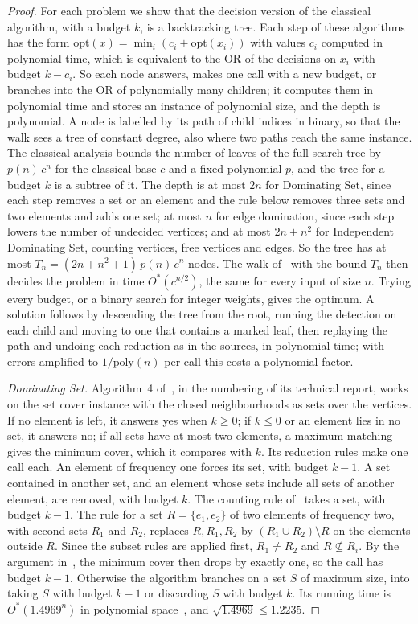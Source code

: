 \documentclass[11pt]{article}
\theoremstyle{remark}
\begin{document}
\begin{proof}
For each problem we show that the decision version of the classical algorithm, with a budget $k$, is a backtracking tree. Each step of these algorithms has the form $\mathrm{opt}(x) = \min_i (c_i + \mathrm{opt}(x_i))$ with values $c_i$ computed in polynomial time, which is equivalent to the OR of the decisions on $x_i$ with budget $k - c_i$. So each node answers, makes one call with a new budget, or branches into the OR of polynomially many children; it computes them in polynomial time and stores an instance of polynomial size, and the depth is polynomial. A node is labelled by its path of child indices in binary, so that the walk sees a tree of constant degree, also where two paths reach the same instance. The classical analysis bounds the number of leaves of the full search tree by $p(n)\,c^n$ for the classical base $c$ and a fixed polynomial $p$, and the tree for a budget $k$ is a subtree of it. The depth is at most $2n$ for Dominating Set, since each step removes a set or an element and the rule below removes three sets and two elements and adds one set; at most $n$ for edge domination, since each step lowers the number of undecided vertices; and at most $2n + n^2$ for Independent Dominating Set, counting vertices, free vertices and edges. So the tree has at most $T_n = (2n + n^2 + 1)\,p(n)\,c^n$ nodes. The walk of~\cite{Mon18} with the bound $T_n$ then decides the problem in time $O^*(c^{n/2})$, the same for every input of size $n$. Trying every budget, or a binary search for integer weights, gives the optimum. A solution follows by descending the tree from the root, running the detection on each child and moving to one that contains a marked leaf, then replaying the path and undoing each reduction as in the sources, in polynomial time; with errors amplified to $1/\mathrm{poly}(n)$ per call this costs a polynomial factor.

\emph{Dominating Set.} Algorithm~4 of~\cite{RB11}, in the numbering of its technical report, works on the set cover instance with the closed neighbourhoods as sets over the vertices. If no element is left, it answers yes when $k \ge 0$; if $k \le 0$ or an element lies in no set, it answers no; if all sets have at most two elements, a maximum matching gives the minimum cover, which it compares with $k$. Its reduction rules make one call each. An element of frequency one forces its set, with budget $k-1$. A set contained in another set, and an element whose sets include all sets of another element, are removed, with budget $k$. The counting rule of~\cite{RB11} takes a set, with budget $k-1$. The rule for a set $R = \{e_1, e_2\}$ of two elements of frequency two, with second sets $R_1$ and $R_2$, replaces $R, R_1, R_2$ by $(R_1 \cup R_2) \setminus R$ on the elements outside $R$. Since the subset rules are applied first, $R_1 \ne R_2$ and $R \not\subseteq R_i$. By the argument in~\cite{RB11}, the minimum cover then drops by exactly one, so the call has budget $k - 1$. Otherwise the algorithm branches on a set $S$ of maximum size, into taking $S$ with budget $k-1$ or discarding $S$ with budget $k$. Its running time is $O^*(1.4969^n)$ in polynomial space~\cite{RB11}, and $\sqrt{1.4969} \le 1.2235$.


\end{proof}
\end{document}

